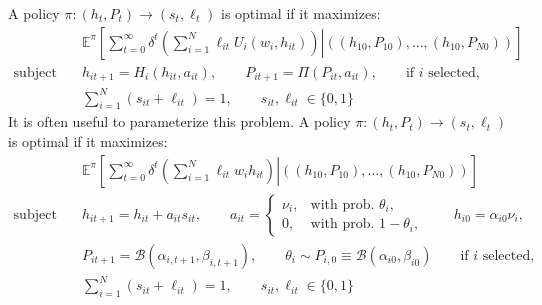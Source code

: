 \documentclass[10 pt]{article}
\newcommand{\gen}[1]{#1}
\newcommand{\gen}[1]{}
\newcommand{\sbr}[1]{\left[ #1 \right]}
\newcommand{\pr}[1]{\left( #1 \right)}
\begin{document}
\gen{
A policy $\pi: (h_t, P_t) \to (s_t, \ell_t)$ is optimal if it maximizes: 
\begin{align*}
& \mathbb{E}^\pi \sbr{
   \sum_{t=0}^\infty \delta^t 
   \left. \pr{\sum_{i=1}^N \ell_{it} U_i(w_i, h_{it})} \right\vert
   \pr{(h_{10}, P_{10}), \dots, (h_{10}, P_{N0})}
} \\
\text{subject to} \quad& h_{it+1} = H_i (h_{it}, a_{it}), \quad \quad
P_{it+1} = \Pi (P_{it}, a_{it}), 
\quad \quad \text{if $i$ selected,} \\
\quad& \sum_{i=1}^N (s_{it} + \ell_{it}) = 1, \quad \quad s_{it}, \ell_{it} \in \{0,1\}
\end{align*}
It is often useful to parameterize this problem.}
A policy $\pi: (h_t, P_t) \to (s_t, \ell_t)$ is optimal if it maximizes:
\begin{align*}
& \mathbb{E}^\pi \sbr{
   \sum_{t=0}^\infty \delta^t 
   \left. \pr{\sum_{i=1}^N \ell_{it} w_i h_{it}} \right\vert
   \pr{(h_{10}, P_{10}), \dots, (h_{10}, P_{N0})}
} \\
\text{subject to} \quad& h_{it+1} = h_{it}+ a_{it} s_{it}, \quad \quad a_{it} = 
   \begin{cases} 
      \nu_i, & \text{with prob. } \theta_i,  \\ 
      0, & \text{with prob. } 1 - \theta_i,
   \end{cases} 
   \quad \quad h_{i0} = \alpha_{i0} \nu_i, \\
\quad& P_{it+1} = \mathcal{B} (\alpha_{i,t+1}, \beta_{i,t+1}), 
   \quad \quad \theta_i \sim P_{i,0} \equiv \mathcal{B} (\alpha_{i0}, \beta_{i0})
   \quad \quad \text{if $i$ selected,} \\
\quad& \sum_{i=1}^N (s_{it} + \ell_{it}) = 1, \quad \quad s_{it}, \ell_{it} \in \{0,1\}
\end{align*}

\end{document}
